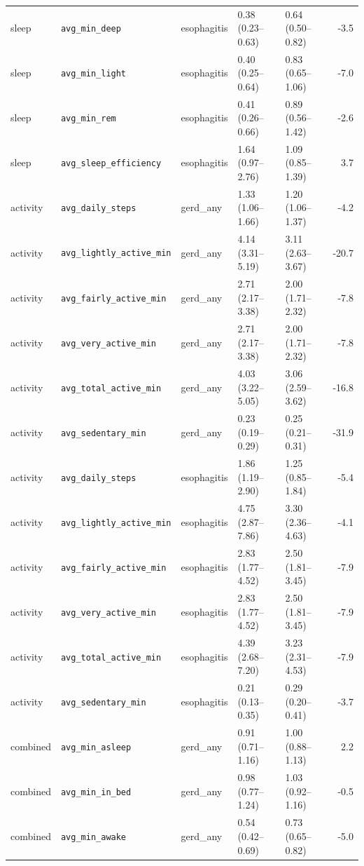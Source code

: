 \documentclass[11pt]{article}
\newcommand{\code}[1]{\texttt{\small #1}}
\begin{document}
\begin{longtable}{@{}p{1.7cm}p{3.0cm}p{1.9cm}p{2.6cm}p{2.6cm}r@{}}
sleep & \code{avg\_min\_deep} & esophagitis & 0.38 (0.23--0.63) & 0.64 (0.50--0.82) & -3.5 \\
sleep & \code{avg\_min\_light} & esophagitis & 0.40 (0.25--0.64) & 0.83 (0.65--1.06) & -7.0 \\
sleep & \code{avg\_min\_rem} & esophagitis & 0.41 (0.26--0.66) & 0.89 (0.56--1.42) & -2.6 \\
sleep & \code{avg\_sleep\_efficiency} & esophagitis & 1.64 (0.97--2.76) & 1.09 (0.85--1.39) & 3.7 \\
activity & \code{avg\_daily\_steps} & gerd\_any & 1.33 (1.06--1.66) & 1.20 (1.06--1.37) & -4.2 \\
activity & \code{avg\_lightly\_active\_min} & gerd\_any & 4.14 (3.31--5.19) & 3.11 (2.63--3.67) & -20.7 \\
activity & \code{avg\_fairly\_active\_min} & gerd\_any & 2.71 (2.17--3.38) & 2.00 (1.71--2.32) & -7.8 \\
activity & \code{avg\_very\_active\_min} & gerd\_any & 2.71 (2.17--3.38) & 2.00 (1.71--2.32) & -7.8 \\
activity & \code{avg\_total\_active\_min} & gerd\_any & 4.03 (3.22--5.05) & 3.06 (2.59--3.62) & -16.8 \\
activity & \code{avg\_sedentary\_min} & gerd\_any & 0.23 (0.19--0.29) & 0.25 (0.21--0.31) & -31.9 \\
activity & \code{avg\_daily\_steps} & esophagitis & 1.86 (1.19--2.90) & 1.25 (0.85--1.84) & -5.4 \\
activity & \code{avg\_lightly\_active\_min} & esophagitis & 4.75 (2.87--7.86) & 3.30 (2.36--4.63) & -4.1 \\
activity & \code{avg\_fairly\_active\_min} & esophagitis & 2.83 (1.77--4.52) & 2.50 (1.81--3.45) & -7.9 \\
activity & \code{avg\_very\_active\_min} & esophagitis & 2.83 (1.77--4.52) & 2.50 (1.81--3.45) & -7.9 \\
activity & \code{avg\_total\_active\_min} & esophagitis & 4.39 (2.68--7.20) & 3.23 (2.31--4.53) & -7.9 \\
activity & \code{avg\_sedentary\_min} & esophagitis & 0.21 (0.13--0.35) & 0.29 (0.20--0.41) & -3.7 \\
combined & \code{avg\_min\_asleep} & gerd\_any & 0.91 (0.71--1.16) & 1.00 (0.88--1.13) & 2.2 \\
combined & \code{avg\_min\_in\_bed} & gerd\_any & 0.98 (0.77--1.24) & 1.03 (0.92--1.16) & -0.5 \\
combined & \code{avg\_min\_awake} & gerd\_any & 0.54 (0.42--0.69) & 0.73 (0.65--0.82) & -5.0 \\

\end{longtable}
\end{document}
